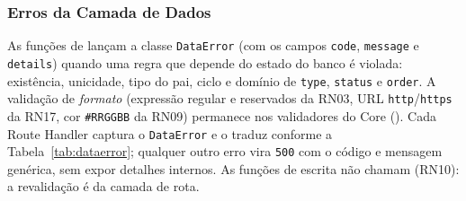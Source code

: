 \subsubsection{Erros da Camada de Dados}\label{sec:arq-dataerror}

As funções de  lançam a classe \texttt{DataError} (com os campos \texttt{code}, \texttt{message} e \texttt{details}) quando uma regra que depende do estado do banco é violada: existência, unicidade, tipo do pai, ciclo e domínio de \texttt{type}, \texttt{status} e \texttt{order}. A validação de \emph{formato} (expressão regular e  reservados da RN03, URL \texttt{http}/\texttt{https} da RN17, cor \texttt{\#RRGGBB} da RN09) permanece nos validadores do Core (). Cada Route Handler captura o \texttt{DataError} e o traduz conforme a Tabela~\ref{tab:dataerror}; qualquer outro erro vira \texttt{500} com o código  e mensagem genérica, sem expor detalhes internos. As funções de escrita não chamam  (RN10): a revalidação é da camada de rota.

